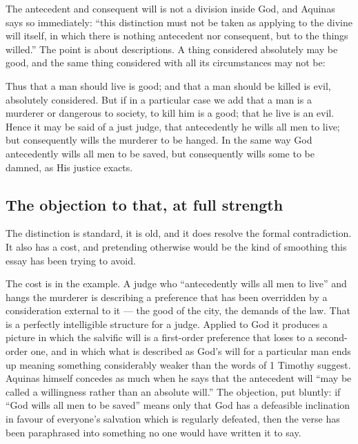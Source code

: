 The antecedent and consequent will is not a division inside God, and Aquinas says so immediately: ``this distinction must not be taken as applying to the divine will itself, in which there is nothing antecedent nor consequent, but to the things willed.'' The point is about descriptions. A thing considered absolutely may be good, and the same thing considered with all its circumstances may not be:

\begin{studyframe}
Thus that a man should live is good; and that a man should be killed is evil, absolutely considered. But if in a particular case we add that a man is a murderer or dangerous to society, to kill him is a good; that he live is an evil. Hence it may be said of a just judge, that antecedently he wills all men to live; but consequently wills the murderer to be hanged. In the same way God antecedently wills all men to be saved, but consequently wills some to be damned, as His justice exacts.
\end{studyframe}

\subsection{The objection to that, at full strength}

The distinction is standard, it is old, and it does resolve the formal contradiction. It also has a cost, and pretending otherwise would be the kind of smoothing this essay has been trying to avoid.

The cost is in the example. A judge who ``antecedently wills all men to live'' and hangs the murderer is describing a preference that has been overridden by a consideration external to it --- the good of the city, the demands of the law. That is a perfectly intelligible structure for a judge. Applied to God it produces a picture in which the salvific will is a first-order preference that loses to a second-order one, and in which what is described as God's will for a particular man ends up meaning something considerably weaker than the words of 1 Timothy suggest. Aquinas himself concedes as much when he says that the antecedent will ``may be called a willingness rather than an absolute will.'' The objection, put bluntly: if ``God wills all men to be saved'' means only that God has a defeasible inclination in favour of everyone's salvation which is regularly defeated, then the verse has been paraphrased into something no one would have written it to say.

